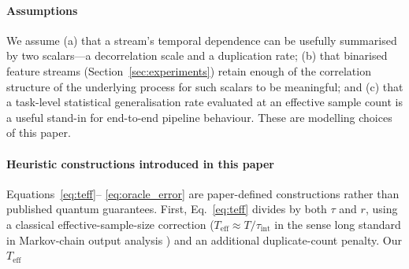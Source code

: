 \documentclass[sensors,article,submit,pdftex,moreauthors]{Definitions/mdpi}
\newcommand{\Teff}{T_{\mathrm{eff}}}
\providecommand{\DIFadd}[1]{{\protect\color{blue}#1}} %
\providecommand{\DIFdel}[1]{} %
\providecommand{\DIFaddbegin}{} %
\providecommand{\DIFaddend}{} %
\providecommand{\DIFdelbegin}{} %
\providecommand{\DIFdelend}{} %
\begin{document}
\paragraph{\DIFadd{Assumptions}} \DIFadd{We assume (a) that a stream's temporal dependence can be usefully summarised by two scalars---a decorrelation scale and a duplication rate; (b) that binarised feature streams (Section~\ref{sec:experiments}) retain enough of the correlation structure of the underlying process for such scalars to be meaningful; and (c) that a task-level statistical generalisation rate evaluated at an effective sample count is a useful stand-in for end-to-end pipeline behaviour. These are modelling choices of this paper.
}

\paragraph{\DIFadd{Heuristic constructions introduced in this paper}} \DIFadd{Equations~\eqref{eq:teff}}\DIFaddend --\DIFdelbegin \DIFdel{\eqref{eq:oracle_error} from the guarantees of }%
\DIFdel{.
First, in the exact framework the correlation overhead enters through the repetition number alone---oracle-construction sample complexity is multiplied by $R$, while the refreshing time only delimits the window over which $R$ is measured---whereas }\DIFdelend \DIFaddbegin \DIFadd{\eqref{eq:oracle_error} are paper-defined constructions rather than published quantum guarantees. First, }\DIFaddend Eq.~\eqref{eq:teff} \DIFdelbegin \DIFdel{additionally divides by }\DIFdelend \DIFaddbegin \DIFadd{divides by both }\DIFaddend $\tau$ \DIFdelbegin \DIFdel{, in the manner of }\DIFdelend \DIFaddbegin \DIFadd{and $r$, using }\DIFaddend a classical effective-sample-size correction ($\Teff \approx T/\tau_{\mathrm{int}}$ \DIFdelbegin \DIFdel{)}\DIFdelend \DIFaddbegin \DIFadd{in the sense long standard in Markov-chain output analysis }\citep{geyer1992practical}\DIFadd{) and an additional duplicate-count penalty}\DIFaddend . Our $\Teff$ \DIFdelbegin \DIFdel{is therefore deliberately }\emph{\DIFdel{more conservative}} %
\end{document}
